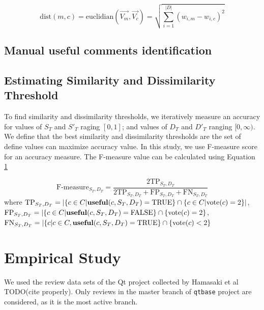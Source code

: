 \documentclass[conference]{IEEEtran}
\begin{document}
\begin{equation}
\mathrm{dist}(m,c) = \mathrm{euclidian}(\overrightarrow{V_m},\overrightarrow{V_c}) = \sqrt{\sum_{i=1}^{|D|}(w_{i,m} - w_{i,c})^2}
\label{eq:euclid}
\end{equation}
\subsection{Manual useful comments identification}

\subsection{Estimating Similarity and Dissimilarity Threshold}
To find similarity and dissimilarity thresholds, we iteratively measure an accuracy for values of $S_T$ and $S'_T$ raging $[0,1]$; and values of $D_T$ and $D'_T$ ranging $[0,\infty)$. We define that the best similarity and dissimilarity thresholds are the set of define values can maximize accuracy value. In this study, we use F-measure score for an accuracy measure. The F-measure value can be calculated using Equation \ref{}

\begin{equation}
\mathrm{F\text{-}measure}_{S_T,D_T} = \frac{2\mathrm{TP}_{S_T,D_T}}{2\mathrm{TP}_{S_T,D_T}+\mathrm{FP}_{S_T,D_T}+\mathrm{FN}_{S_T,D_T}}
\label{eq:precision}
\end{equation}
where $\mathrm{TP}_{S_T,D_T}= |\{ c \in C |  \text{\textbf{useful}}(c,S_T,D_T) = \mathrm{TRUE} \}\cap \{c \in C| \mathrm{vote}(c) = 2\}|$,  $\mathrm{FP}_{S_T,D_T} = |\{ c \in C | \text{\textbf{useful}}(c,S_T,D_T) = \mathrm{FALSE} \}\cap \{\mathrm{vote}(c) = 2\} $, $\mathrm{FN}_{S_T,D_T} = |\{ c | c \in C, \text{\textbf{useful}}(c,S_T,D_T) = \mathrm{TRUE} \}\cap \{\mathrm{vote}(c) < 2\} $


\section{Empirical Study}

We used the review data sets of the Qt project collected by Hamasaki et al TODO(cite properly).
Only reviews in the master branch of \texttt{qtbase} project are considered,
as it is the most active branch.
\end{document}
